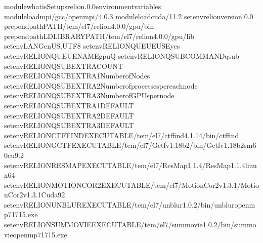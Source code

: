 \documentclass[a4paper,10pt,english]{sphinxmanual}
\begin{document}
\begin{sphinxVerbatim}[commandchars=\\\{\}]
module\PYGZhy{}whatisSetupsrelion.0.0environmentvariables
moduleloadmpi/gcc/openmpi/4.0.3
moduleloadcuda/11.2
setenvrelion\PYGZus{}version.0.0
prepend\PYGZhy{}pathPATH/tem/el7/relion\PYGZhy{}4.0.0/gpu/bin
prepend\PYGZhy{}pathLD\PYGZus{}LIBRARY\PYGZus{}PATH/tem/el7/relion\PYGZhy{}4.0.0/gpu/lib
setenvLANGen\PYGZus{}US.UTF\PYGZhy{}8
setenvRELION\PYGZus{}QUEUE\PYGZus{}USEyes
setenvRELION\PYGZus{}QUEUE\PYGZus{}NAMEgpuQ
setenvRELION\PYGZus{}QSUB\PYGZus{}COMMANDqsub
setenvRELION\PYGZus{}QSUB\PYGZus{}EXTRA\PYGZus{}COUNT
setenvRELION\PYGZus{}QSUB\PYGZus{}EXTRA1NumberofNodes
setenvRELION\PYGZus{}QSUB\PYGZus{}EXTRA2Numberofprocessespereachnode
setenvRELION\PYGZus{}QSUB\PYGZus{}EXTRA3NumberofGPUspernode
setenvRELION\PYGZus{}QSUB\PYGZus{}EXTRA1\PYGZus{}DEFAULT
setenvRELION\PYGZus{}QSUB\PYGZus{}EXTRA2\PYGZus{}DEFAULT
setenvRELION\PYGZus{}QSUB\PYGZus{}EXTRA3\PYGZus{}DEFAULT
setenvRELION\PYGZus{}CTFFIND\PYGZus{}EXECUTABLE/tem/el7/ctffind\PYGZhy{}4.1.14/bin/ctffind
setenvRELION\PYGZus{}GCTF\PYGZus{}EXECUTABLE/tem/el7/Gctf\PYGZus{}v1.18\PYGZus{}b2/bin/Gctf\PYGZus{}v1.18\PYGZus{}b2\PYGZus{}sm60\PYGZus{}cu9.2
setenvRELION\PYGZus{}RESMAP\PYGZus{}EXECUTABLE/tem/el7/ResMap\PYGZhy{}1.1.4/ResMap\PYGZhy{}1.1.4\PYGZhy{}linux64
setenvRELION\PYGZus{}MOTIONCOR2\PYGZus{}EXECUTABLE/tem/el7/MotionCor2\PYGZus{}v1.3.1/MotionCor2\PYGZus{}v1.3.1\PYGZhy{}Cuda92
setenvRELION\PYGZus{}UNBLUR\PYGZus{}EXECUTABLE/tem/el7/unblur\PYGZus{}1.0.2/bin/unblur\PYGZus{}openmp\PYGZus{}7\PYGZus{}17\PYGZus{}15.exe
setenvRELION\PYGZus{}SUMMOVIE\PYGZus{}EXECUTABLE/tem/el7/summovie\PYGZus{}1.0.2/bin/sum\PYGZus{}movie\PYGZus{}openmp\PYGZus{}7\PYGZus{}17\PYGZus{}15.exe

\end{sphinxVerbatim}
\end{document}
